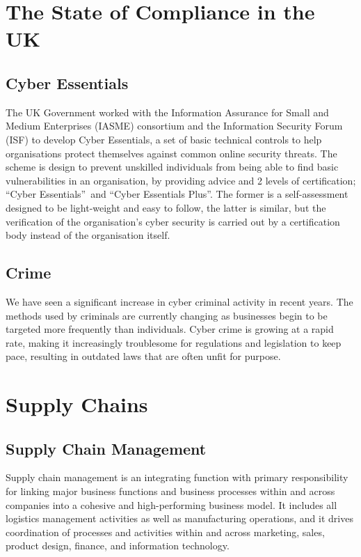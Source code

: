 \section{The State of Compliance in the UK}

    \subsection{Cyber Essentials}
        The UK Government worked with the Information Assurance for Small and Medium Enterprises (IASME) consortium and the Information Security Forum (ISF) to develop Cyber Essentials, a set of basic technical controls to help organisations protect themselves against common online security threats. \cite{CyberEssentials} The scheme is design to prevent unskilled individuals from being able to find basic vulnerabilities in an organisation, by providing advice and 2 levels of certification; \textquotedblleft Cyber Essentials\textquotedblright\ and \textquotedblleft Cyber Essentials Plus\textquotedblright. The former is a self-assessment designed to be light-weight and easy to follow, the latter is similar, but the verification of the organisation\textquoteright s cyber security is carried out by a certification body instead of the organisation itself.

    \subsection{Crime}
        We have seen a significant increase in cyber criminal activity in recent years. The methods used by criminals are currently changing as businesses begin to be targeted more frequently than individuals. Cyber crime is growing at a rapid rate, making it increasingly troublesome for regulations and legislation to keep pace, resulting in outdated laws that are often unfit for purpose. \cite{GDPR}

\section{Supply Chains}

    \subsection{Supply Chain Management}
        Supply chain management is an integrating function with primary responsibility for linking major business functions and business processes within and across companies into a cohesive and high-performing business model. It includes all logistics management activities as well as manufacturing operations, and it drives coordination of processes and activities within and across marketing, sales, product design, finance, and information technology. \cite{CSCRM}

